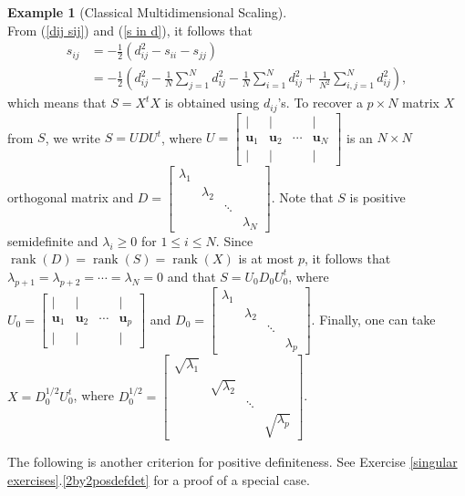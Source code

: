\documentclass[12pt,letterpaper]{book}
\numberwithin{equation}{section}
\theoremstyle{definition}
\newtheorem{example}[thm]{\textbf{Example}}
\newcommand{\vu}{\bm{u}}
\newcommand{\rank}{\operatorname{rank}}
\begin{document}
\begin{example}[Classical Multidimensional Scaling]
\begin{equation}
\end{equation}
From (\ref{dij sij}) and (\ref{s in d}), it follows that
\begin{align*}s_{ij}&=-\frac{1}{2}\left(d_{ij}^2-s_{ii}-s_{jj}\right)\\
&=-\frac{1}{2}\left(d_{ij}^2-\frac{1}{N}\sum_{j=1}^N d_{ij}^2-\frac{1}{N}\sum_{i=1}^N d_{ij}^2+\frac{1}{N^2}\sum_{i,j=1}^N d_{ij}^2\right),
\end{align*}
which means that $S=X^tX$ is obtained using $d_{ij}$'s. To recover a $p\times N$ matrix $X$ from $S$, we write $S=UDU^t$, where
$U=\left[\begin{array}{cccc} | & | &   & | \\ \vu_1 & \vu_2 & \cdots & \vu_N \\ | & | &  & | \end{array}\right]$ is an $N\times N$ orthogonal matrix and $D=\left[\begin{array}{cccc} \lambda_1 & & &  \\ & \lambda_2 & & \\ & & \ddots & \\ & & & \lambda_N\end{array}\right]$. Note that $S$ is positive semidefinite and $\lambda_i\geq 0$ for $1\leq i \leq N$. Since $\rank(D)=\rank(S)=\rank(X)$ is at most $p$, it follows that $\lambda_{p+1}=\lambda_{p+2}=\cdots=\lambda_{N}=0$ and that $S=U_0D_0U_0^t$, where $U_0=\left[\begin{array}{cccc} | & | &   & | \\ \vu_1 & \vu_2 & \cdots & \vu_p \\ | & | &  & | \end{array}\right]$ and $D_0=\left[\begin{array}{cccc} \lambda_1 & & &  \\ & \lambda_2 & & \\ & & \ddots & \\ & & & \lambda_p\end{array}\right]$. Finally, one can take $X=D_0^{1/2}U_0^t$, where $D_0^{1/2}=\left[\begin{array}{cccc} \sqrt{\lambda_1} & & &  \\ & \sqrt{\lambda_2} & & \\ & & \ddots & \\ & & & \sqrt{\lambda_p} \end{array}\right]$.
\end{example}

The following is another criterion for positive definiteness. See Exercise \ref{singular exercises}.\ref{2by2posdefdet} for a proof of a special case.
\end{document}
